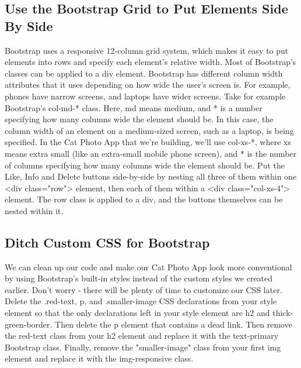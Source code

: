 \documentclass{article}%
\begin{document}
\subsection{Use the Bootstrap Grid to Put Elements Side By Side}%
\label{subsec:UsetheBootstrapGridtoPutElementsSideBySide}%
Bootstrap uses a responsive 12{-}column grid system, which makes it easy to put elements into rows and specify each element's relative width. Most of Bootstrap's classes can be applied to a div element.\newline%
Bootstrap has different column width attributes that it uses depending on how wide the user's screen is. For example, phones have narrow screens, and laptops have wider screens.\newline%
Take for example Bootstrap's col{-}md{-}* class. Here, md means medium, and * is a number specifying how many columns wide the element should be. In this case, the column width of an element on a medium{-}sized screen, such as a laptop, is being specified.\newline%
In the Cat Photo App that we're building, we'll use col{-}xs{-}*, where xs means extra small (like an extra{-}small mobile phone screen), and * is the number of columns specifying how many columns wide the element should be.\newline%
Put the Like, Info and Delete buttons side{-}by{-}side by nesting all three of them within one <div class="row"> element, then each of them within a <div class="col{-}xs{-}4"> element.\newline%
The row class is applied to a div, and the buttons themselves can be nested within it.\newline%

%
\subsection{Ditch Custom CSS for Bootstrap}%
\label{subsec:DitchCustomCSSforBootstrap}%
We can clean up our code and make our Cat Photo App look more conventional by using Bootstrap's built{-}in styles instead of the custom styles we created earlier.\newline%
Don't worry {-} there will be plenty of time to customize our CSS later.\newline%
Delete the .red{-}text, p, and .smaller{-}image CSS declarations from your style element so that the only declarations left in your style element are h2 and thick{-}green{-}border.\newline%
Then delete the p element that contains a dead link. Then remove the red{-}text class from your h2 element and replace it with the text{-}primary Bootstrap class.\newline%
Finally, remove the "smaller{-}image" class from your first img element and replace it with the img{-}responsive class.\newline%
\end{document}
